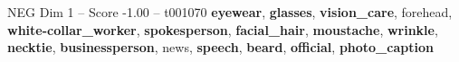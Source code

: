 \begin{textsample}{NEG Dim 1 – Score -1.00 – t001070}  \label{ex:f1_neg_032}
\textbf{eyewear}, \textbf{glasses}, \textbf{vision\_care}, forehead, \textbf{white-collar\_worker}, \textbf{spokesperson}, \textbf{facial\_hair}, \textbf{moustache}, \textbf{wrinkle}, \textbf{necktie}, \textbf{businessperson}, news, \textbf{speech}, \textbf{beard}, \textbf{official}, \textbf{photo\_caption}

\end{textsample}
